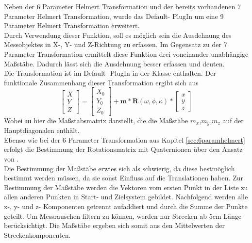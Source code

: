 Neben der 6 Parameter Helmert Transformation und der bereits vorhandenen 7 Parameter Helmert Transformation, wurde das Default- PlugIn um eine 9 Parameter Helmert Transformation erweitert.\\
Durch Verwendung dieser Funktion, soll es möglich sein die Ausdehnung des Messobjektes in X-, Y- und Z-Richtung zu erfassen. Im Gegensatz zu der 7 Parameter Transformation ermittelt diese Funktion drei voneinander unabhängige Maßstäbe. Dadurch lässt sich die Ausdehnung besser erfassen und deuten.\\
Die Transformation ist im Default- PlugIn in der Klasse  enthalten.
Der funktionale Zusammenhang dieser Transformation ergibt sich aus
\begin{equation}
\begin{bmatrix} X \\ Y \\ Z \end{bmatrix} = \begin{bmatrix} X_{0} \\ Y_{0} \\ Z_{0} \end{bmatrix} + \textbf{m} * \textbf{R}(\omega,\phi,\kappa) * \begin{bmatrix} x \\ y \\ z \end{bmatrix}
\end{equation}
Wobei \textbf{m} hier die Maßstabsmatrix darstellt, die die Maßstäbe \textbf{$m_{x}$},\textbf{$m_{y}$},\textbf{$m_{z}$} auf der Hauptdiagonalen enthält.\\
Ebenso wie bei der 6 Parameter Transformation aus Kapitel \ref{sec:6paramhelmert} erfolgt die Bestimmung der Rotationsmatrix mit Quaternionen über den Ansatz von \cite{Drixler1993}.\\
Die Bestimmung der Maßstäbe erwies sich als schwierig, da diese bestmöglich bestimmt werden müssen, da sie sonst Einfluss auf die Translationen haben. Zur Bestimmung der Maßstäbe werden die Vektoren vom ersten Punkt in der Liste zu allen anderen Punkten in Start- und Zielsystem gebildet. Nachfolgend werden alle x-, y- und z- Komponenten getrennt aufaddiert und durch die Summe der Punkte geteilt. Um Messrauschen filtern zu können, werden nur Strecken ab 5cm Länge berücksichtigt. Die Maßstäbe ergeben sich somit aus den Mittelwerten der Streckenkomponenten.

